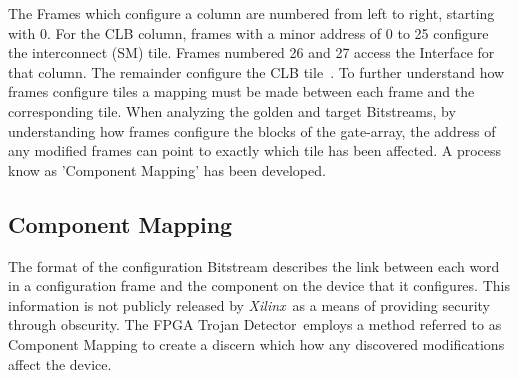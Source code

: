 \documentclass[conference]{IEEEtran}
\newcommand{\Xilinx}{\textit{\gls{Xilinx}}~}
\newcommand{\Name}{\acrshort{FPGA} Trojan Detector}
\newcommand{\NameNoPeriod}{\Name~}
\begin{document}
The Frames which configure a column are numbered from left to right, starting with 0.  
For the \acrfull{CLB} column, frames with a minor address of 0 to 25 configure the interconnect (\acrshort{SM}) tile.
Frames numbered 26 and 27 access the Interface for that column. 
The remainder configure the \acrshort{CLB} tile~\cite{virtex5ConfigGuide}.
To further understand how frames configure tiles a mapping must be made between each frame and the corresponding tile.
When analyzing the \gls{golden} and \gls{target} \gls{Bitstream}s, by understanding how frames configure the blocks of the gate-array, the address of any modified frames can point to exactly which tile has been affected.
A process know as 'Component Mapping' has been developed. 

\subsection{Component Mapping} \label{sec:tileMapping}
The format of the configuration \gls{Bitstream} describes the link between each word in a configuration frame and the component on the device that it configures. This information is not publicly released by \Xilinx as a means of providing security through obscurity.
The \NameNoPeriod employs a method referred to as Component Mapping to create a discern which how any discovered modifications affect the device.
\end{document}
